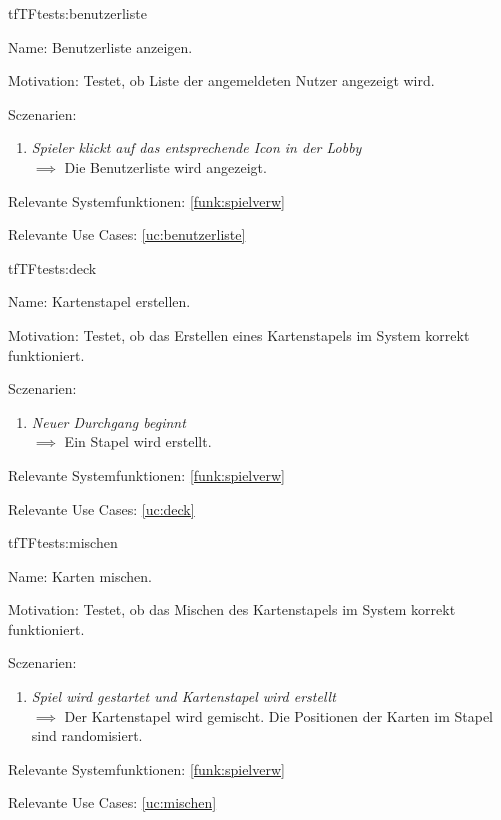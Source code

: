 \begin{description}[leftmargin=5em, style=sameline]
\begin{lhp}{tf}{TF}{tests:benutzerliste}
	\item [Name:] Benutzerliste anzeigen.
	\item [Motivation:] Testet, ob Liste der angemeldeten Nutzer angezeigt wird.
	\item [Sczenarien:] \hfill
		\begin{enumerate}
			\item \textit{Spieler klickt auf das entsprechende Icon in der Lobby} \\ $\implies$ Die Benutzerliste wird angezeigt.
		\end{enumerate}
	\item [Relevante Systemfunktionen:] \ref{funk:spielverw}
	\item [Relevante Use Cases:] \ref{uc:benutzerliste}
\end{lhp}


\begin{lhp}{tf}{TF}{tests:deck}
	\item [Name:] Kartenstapel erstellen.
	\item [Motivation:] Testet, ob das Erstellen eines Kartenstapels im System korrekt funktioniert.
	\item [Sczenarien:] \hfill
		\begin{enumerate}
			\item \textit{ Neuer Durchgang beginnt}  \\ $\implies$ Ein Stapel wird erstellt.
		\end{enumerate}
	\item [Relevante Systemfunktionen:] \ref{funk:spielverw}
	\item [Relevante Use Cases:] \ref{uc:deck}
\end{lhp}



\begin{lhp}{tf}{TF}{tests:mischen}
	\item [Name:] Karten mischen.
	\item [Motivation:] Testet, ob das Mischen des Kartenstapels im System korrekt funktioniert.
	\item [Sczenarien:] \hfill
		\begin{enumerate}
			\item \textit{Spiel wird gestartet und Kartenstapel wird erstellt} \\ $\implies$ Der Kartenstapel wird gemischt. Die Positionen der Karten im Stapel sind randomisiert.
		\end{enumerate}
	\item [Relevante Systemfunktionen:] \ref{funk:spielverw}
	\item [Relevante Use Cases:] \ref{uc:mischen}
\end{lhp}




\end{description}
